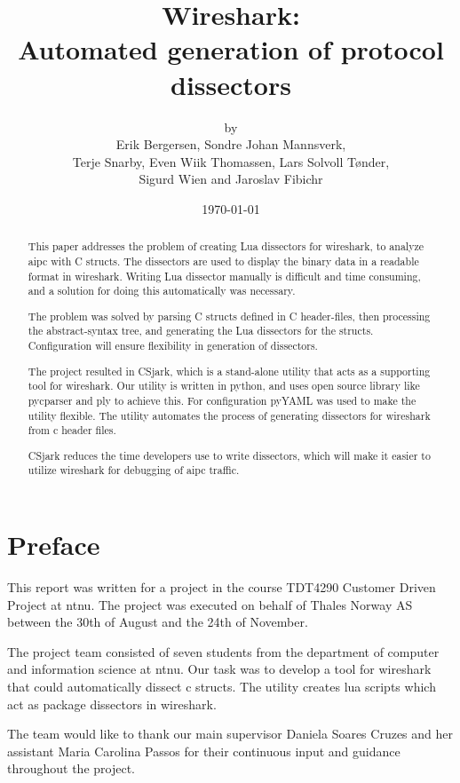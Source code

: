 \documentclass[a4paper, 11pt]{report}
\title{Wireshark:\\ Automated generation of protocol dissectors}
\author{by\\ Erik Bergersen, Sondre Johan Mannsverk,\\ Terje Snarby,
		Even Wiik Thomassen, Lars Solvoll Tønder,\\ Sigurd Wien
		and Jaroslav Fibichr}
\date{\today}
\begin{document}


\begin{abstract}
This paper addresses the problem of creating Lua dissectors for \Gls{wireshark}, 
to analyze \gls{aipc} with C structs. The dissectors are used to display the 
binary data in a readable format in \Gls{wireshark}. Writing Lua dissector 
manually is difficult and time consuming, and a solution for doing this 
automatically was necessary.  

The problem was solved by parsing C structs defined in C header-files, then 
processing the abstract-syntax tree, and generating the Lua dissectors 
for the structs. Configuration will ensure flexibility in generation of 
dissectors.

The project resulted in CSjark, which is a stand-alone \gls{utility} that acts 
as a supporting tool for \Gls{wireshark}. Our \gls{utility} is written in 
\Gls{python}, and uses open source {library} like \gls{pycparser} and 
\gls{ply} to achieve this. For configuration pyYAML was used to make the 
utility flexible. The \gls{utility} automates the process of generating 
\glspl{dissector} for \Gls{wireshark} from \Gls{c} \gls{header} files. 

CSjark reduces the time developers use to write dissectors, which 
will make it easier to utilize \Gls{wireshark} for debugging of  \gls{aipc} 
traffic.
\end{abstract}

\chapter*{Preface}
This report was written for a project in the course TDT4290 Customer Driven
Project at \Gls{ntnu}. The project
was executed on behalf of Thales Norway AS between the 30th of August and the
24th of November.

The project team consisted of seven students from the department of computer
and information science at \Gls{ntnu}. Our task was to develop a tool for \Gls{wireshark}
that could automatically dissect \Gls{c} \glspl{struct}. The \gls{utility} creates \Gls{lua} \glspl{script}
which act as package \glspl{dissector} in \Gls{wireshark}. 

The team would like to thank our main supervisor Daniela Soares Cruzes
and her assistant Maria Carolina Passos for their continuous input and
guidance throughout the project.
\end{document}
